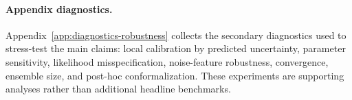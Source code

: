\paragraph{Appendix diagnostics.}
Appendix~\ref{app:diagnostics-robustness} collects the secondary diagnostics used to stress-test the main claims: local calibration by predicted uncertainty, parameter sensitivity, likelihood misspecification, noise-feature robustness, convergence, ensemble size, and post-hoc conformalization. These experiments are supporting analyses rather than additional headline benchmarks.
